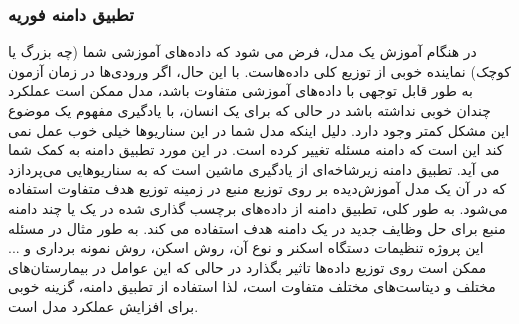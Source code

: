 \subsubsection{تطبیق دامنه فوریه}
در هنگام آموزش یک مدل، فرض می شود که داده‌های آموزشی شما (چه بزرگ یا کوچک) نماینده خوبی از توزیع کلی داده‌هاست.
با این حال، اگر ورودی‌ها در زمان آزمون به طور قابل توجهی با داده‌های آموزشی متفاوت باشد، مدل ممکن است عملکرد چندان خوبی نداشته باشد در حالی که برای یک انسان، با یادگیری مفهوم یک موضوع این مشکل کمتر وجود دارد.
دلیل اینکه مدل شما در این سناریوها خیلی خوب عمل نمی کند این است که دامنه مسئله تغییر کرده است. در این مورد تطبیق دامنه به کمک شما می آید. تطبیق دامنه زیرشاخه‌ای از یادگیری ماشین است که به سناریوهایی می‌پردازد که در آن یک مدل آموزش‌دیده بر روی توزیع منبع در زمینه توزیع هدف متفاوت استفاده می‌شود. به طور کلی، تطبیق دامنه از داده‌های برچسب گذاری شده در یک یا چند دامنه منبع برای حل وظایف جدید در یک دامنه هدف استفاده می کند.
\newline
به طور مثال در مسئله این پروژه تنظیمات دستگاه اسکنر و نوع آن، روش اسکن، روش نمونه برداری و ... ممکن است روی توزیع داده‌ها تاثیر بگذارد در حالی که این عوامل در بیمارستان‌های مختلف و دیتاست‌های مختلف متفاوت است، لذا استفاده از تطبیق دامنه، گزینه خوبی برای افزایش عملکرد مدل است.


